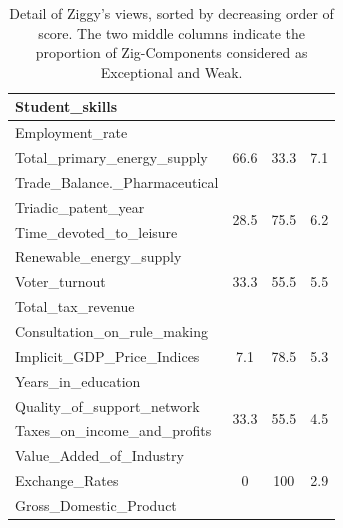 \begin{table}[!t]
\begin{tabular}{p{4cm} c c c}
        Student\_skills&&&\\
        \hline
        Employment\_rate&
        \multirow{3}{*}{66.6} &\multirow{3}{*}{33.3} & \multirow{3}{*}{7.1} \\
        Total\_primary\_energy\_supply&&&\\ 
        Trade\_Balance.\_Pharmaceutical&&&\\ 
        \hline
        Triadic\_patent\_year&
        \multirow{2}{*}{28.5} &\multirow{2}{*}{75.5} & \multirow{2}{*}{6.2} \\
        Time\_devoted\_to\_leisure&&&\\ 
        \hline
        Renewable\_energy\_supply&
        \multirow{3}{*}{33.3} &\multirow{3}{*}{55.5} & \multirow{3}{*}{5.5} \\
        Voter\_turnout&&&\\ 
        Total\_tax\_revenue&&&\\ 
        \hline
        Consultation\_on\_rule\_making&
        \multirow{3}{*}{7.1} &\multirow{3}{*}{78.5} & \multirow{3}{*}{5.3} \\
        Implicit\_GDP\_Price\_Indices&&&\\
        Years\_in\_education&&&\\
        \hline
        Quality\_of\_support\_network&
        \multirow{2}{*}{33.3} &\multirow{2}{*}{55.5} & \multirow{2}{*}{4.5} \\
        Taxes\_on\_income\_and\_profits&&&\\
        \hline
        Value\_Added\_of\_Industry&
        \multirow{3}{*}{0} &\multirow{3}{*}{100} & \multirow{3}{*}{2.9} \\
        Exchange\_Rates&&&\\
        Gross\_Domestic\_Product&&&\\
        \hline
    \end{tabular}
    \caption{Detail of Ziggy's views, sorted by decreasing order of score. The
    two middle columns indicate the proportion of Zig-Components considered as
Exceptional and Weak.}
    \label{tab:ziggysviews}
\end{table}
